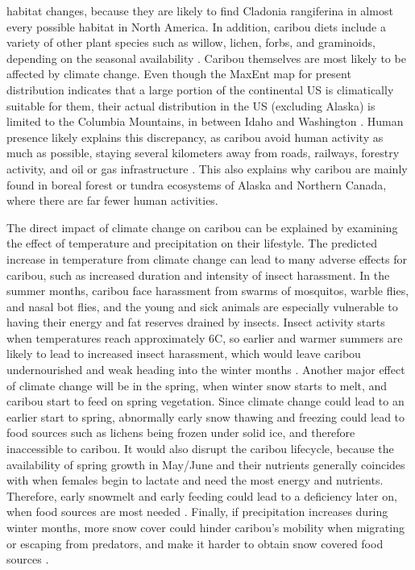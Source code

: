 \documentclass[twoside]{article}
\begin{document}
habitat changes, because they are likely to find Cladonia rangiferina in
almost every possible habitat in North America. In addition, caribou diets
include a variety of other plant species such as willow, lichen, forbs, and
graminoids, depending on the seasonal availability \cite{elenart}.
\indent Caribou themselves are most likely to be affected by climate change.
Even though the MaxEnt map for present distribution indicates that a large
portion of the continental US is climatically suitable for them, their actual
distribution in the US (excluding Alaska) is limited to the Columbia Mountains,
in between Idaho and Washington \cite{usfs2}. Human presence likely explains this
discrepancy, as caribou avoid human activity as much as possible, staying
several kilometers away from roads, railways, forestry activity, and oil or
gas infrastructure \cite{mfesta}. This also explains why caribou are
mainly found in boreal forest or tundra ecosystems of Alaska and Northern
Canada, where there are far fewer human activities.

\indent The direct impact of climate change on caribou can be explained by
examining the effect of temperature and precipitation on their lifestyle.
The predicted increase in temperature from climate change can lead to many
adverse effects for caribou, such as increased duration and intensity of
insect harassment. In the summer months, caribou face harassment from
swarms of mosquitos, warble flies, and nasal bot flies, and the young and
sick animals are especially vulnerable to having their energy and fat
reserves drained by insects. Insect activity starts when temperatures
reach approximately 6\degree C, so earlier and warmer summers are likely to lead
to increased insect harassment, which would leave caribou undernourished
and weak heading into the winter months \cite{jbrotton}. Another major
effect of climate change will be in the spring, when winter snow starts
to melt, and caribou start to feed on spring vegetation. Since climate
change could lead to an earlier start to spring, abnormally early snow
thawing and freezing could lead to food sources such as lichens being
frozen under solid ice, and therefore inaccessible to caribou. It would
also disrupt the caribou lifecycle, because the availability of spring
growth in May/June and their nutrients generally coincides with when
females begin to lactate and need the most energy and nutrients.
Therefore, early snowmelt and early feeding could lead to a deficiency
later on, when food sources are most needed \cite{jbrotton}. Finally,
if precipitation increases during winter months, more snow cover could
hinder caribou’s mobility when migrating or escaping from predators, and
make it harder to obtain snow covered food sources \cite{jbrotton}.
\end{document}

